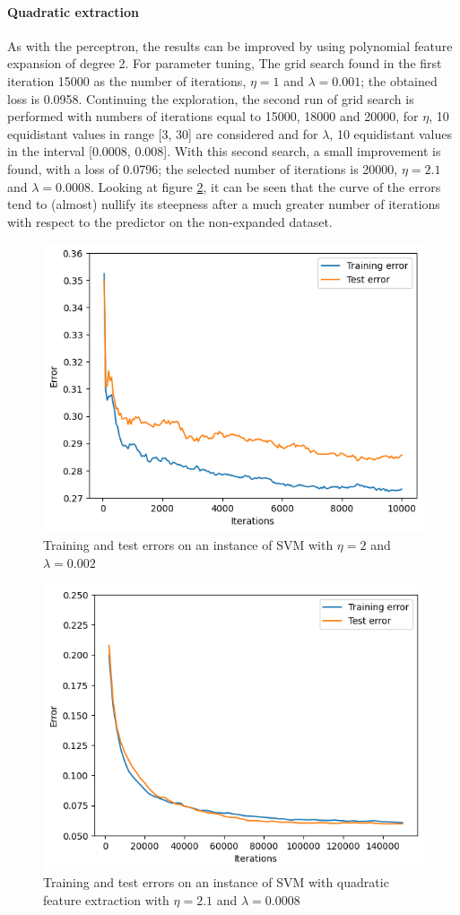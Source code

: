 \documentclass{article}
\begin{document}
\paragraph{Quadratic extraction}
As with the perceptron, the results can be improved by using polynomial feature expansion of degree 2. For parameter tuning, The grid search found in the first iteration 15000 as the number of iterations, $\eta=1$ and $\lambda=0.001$; the obtained loss is 0.0958. Continuing the exploration, the second run of grid search is performed with numbers of iterations equal to 15000, 18000 and 20000, for $\eta$, 10 equidistant values in range [3, 30] are considered and for $\lambda$, 10 equidistant values in the interval [0.0008, 0.008]. With this second search, a small improvement is found, with a loss of 0.0796; the selected number of iterations is 20000, $\eta=2.1$ and $\lambda=0.0008$. Looking at figure \ref{fig:quad_svm}, it can be seen that the curve of the errors tend to (almost) nullify its steepness after a much greater number of iterations with respect to the predictor on the non-expanded dataset.
\begin{figure}
	\centering
	\includegraphics[width=0.5\columnwidth]{../plots/svm.png}
	\caption{Training and test errors on an instance of SVM with $\eta=2$ and $\lambda=0.002$}
	\label{fig:svm}
\end{figure}
\begin{figure}
	\centering
	\includegraphics[width=0.5\columnwidth]{../plots/quad_svm.png}
	\caption{Training and test errors on an instance of SVM with quadratic feature extraction with  $\eta=2.1$ and $\lambda=0.0008$}
	\label{fig:quad_svm}
\end{figure}
\end{document}
